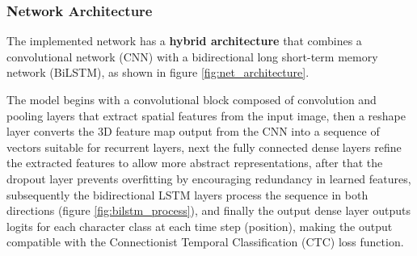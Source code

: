 \documentclass[11pt,letterpaper]{article}
\begin{document}
	\subsubsection{Network Architecture}
	The implemented network has a \textbf{hybrid architecture} that combines a convolutional network (CNN) with a bidirectional long short-term memory network (BiLSTM), as shown in figure \ref{fig:net_architecture}.
	
	The model begins with a convolutional block composed of convolution and pooling layers that extract spatial features from the input image, then a reshape layer converts the 3D feature map output from the CNN into a sequence of vectors suitable for recurrent layers, next the fully connected dense layers refine the extracted features to allow more abstract representations, after that the dropout layer prevents overfitting by encouraging redundancy in learned features, subsequently the bidirectional LSTM layers process the sequence in both directions (figure \ref{fig:bilstm_process}), and finally the output dense layer outputs logits for each character class at each time step (position), making the output compatible with the Connectionist Temporal Classification (CTC) loss function.
	
\end{document}
